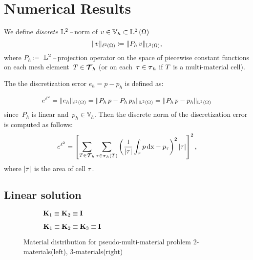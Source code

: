 \section{Numerical Results}\label{sec:num}

We define \textit{discrete} ${\mathbb L^2}$\,--\,norm of $v \in \mathbb V_h \subset {\mathbb L^2\left({\Omega}\right)}$
\begin{equation}\label{l2}
  \| v \|_{{\ell^2\left({\Omega}\right)}} \coloneqq \| P_h\,v \|_{{\mathbb L^2\left({\Omega}\right)}},
\end{equation}
where $P_h \coloneqq$ ${\mathbb L^2}$\,--\,projection operator on the space of piecewise constant
functions on each mesh element~$T \in {\boldsymbol{\mathbf{\mathcal T}}}_h$ (or on each~$\tau \in {\boldsymbol{\mathbf{\mathcal \tau}}}_h$
if $T$ is a  multi-material cell).

The the discretization error $e_h = p - p_h$ is defined as:

\begin{equation*}
  e^{{\ell^2}}_{} =  \|e_h  \|_{{\ell^2\left({\Omega}\right)}} = \| P_h\,p - P_h\,p_h \|_{{\mathbb L^2\left({\Omega}\right)}} = \| P_h\,p - p_h \|_{{\mathbb L^2\left({\Omega}\right)}}
\end{equation*}
\noindent since~$P_h$ is linear and~$p_h \in \mathbb V_h$.  Then the discrete norm of the discretization error is computed as follows:
$$
e^{{\ell^2}}_{} = \left[\sum\limits_{T \in {\boldsymbol{\mathbf{\mathcal T}}}_h}\sum\limits_{\tau\in{\boldsymbol{\mathbf{\mathcal \tau}}}_h(T)} \left(\frac{1}{|\tau|}\int_{\tau} p \,{\rm dx} - p_{\tau}\right)^2|\tau|\right]^2,
$$
where $|\tau|$ is
the area of cell $\tau$.



\subsection{Linear solution}

	\begin{figure}[h]
		\centering
		\begin{subfigure}{.41\linewidth}
			\centering
			\caption{$\boldsymbol{\mathbf{K}}_1 \equiv \boldsymbol{\mathbf{K}}_2 \equiv \boldsymbol{\mathbf{I}}$}
			\label{fig:fake:2}
		\end{subfigure}%
		\hfill
		\begin{subfigure}{.41\linewidth}
			\centering
			\caption{$\boldsymbol{\mathbf{K}}_1 \equiv \boldsymbol{\mathbf{K}}_2 \equiv \boldsymbol{\mathbf{K}}_3 \equiv \boldsymbol{\mathbf{I}}$}
			\label{fig:fake:3}
		\end{subfigure}
		\caption{Material distribution for pseudo-multi-material problem 2-materials(left), 3-materials(right) \label{fig:fake}}		
	\end{figure}

